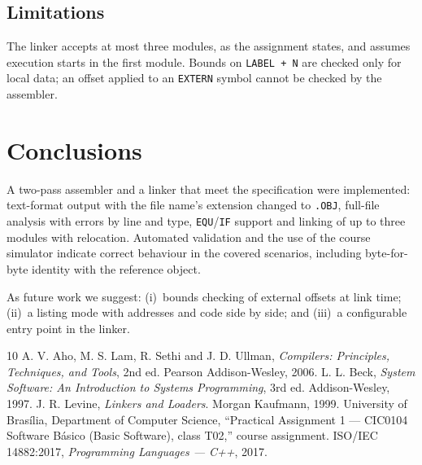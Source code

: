 \documentclass[conference]{IEEEtran}
\begin{document}
\subsection{Limitations}
The linker accepts at most three modules, as the assignment states, and assumes execution starts in the first module. Bounds on \texttt{LABEL + N} are checked only for local data; an offset applied to an \texttt{EXTERN} symbol cannot be checked by the assembler.

\section{Conclusions}
A two-pass assembler and a linker that meet the specification were implemented: text-format output with the file name's extension changed to \texttt{.OBJ}, full-file analysis with errors by line and type, \texttt{EQU}/\texttt{IF} support and linking of up to three modules with relocation. Automated validation and the use of the course simulator indicate correct behaviour in the covered scenarios, including byte-for-byte identity with the reference object.

As future work we suggest: (i)~bounds checking of external offsets at link time; (ii)~a listing mode with addresses and code side by side; and (iii)~a configurable entry point in the linker.

\begin{thebibliography}{10}
 A. V. Aho, M. S. Lam, R. Sethi and J. D. Ullman, \emph{Compilers: Principles, Techniques, and Tools}, 2nd ed. Pearson Addison-Wesley, 2006.
 L. L. Beck, \emph{System Software: An Introduction to Systems Programming}, 3rd ed. Addison-Wesley, 1997.
 J. R. Levine, \emph{Linkers and Loaders}. Morgan Kaufmann, 1999.
 University of Brasília, Department of Computer Science, ``Practical Assignment 1 --- CIC0104 Software Básico (Basic Software), class T02,'' course assignment.
 ISO/IEC 14882:2017, \emph{Programming Languages --- C++}, 2017.
\end{thebibliography}
\end{document}
